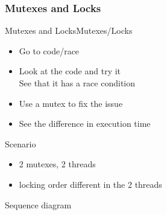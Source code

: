 \begin{frame}[fragile]
  \frametitle{Mutexes and Locks}
  \begin{exerciseWithShortcut}{Mutexes and Locks}{Mutexes/Locks}
    \begin{itemize}
    \item Go to code/race
    \item Look at the code and try it\\
      See that it has a race condition
    \item Use a mutex to fix the issue
    \item See the difference in execution time
    \end{itemize}
  \end{exerciseWithShortcut}
\end{frame}

\begin{frame}[fragile]
  \begin{block}{Scenario}
    \begin{itemize}
    \item 2 mutexes, 2 threads
    \item locking order different in the 2 threads
    \end{itemize}
  \end{block}
  \pause
  \begin{block}{Sequence diagram}
  \end{block}
\end{frame}

